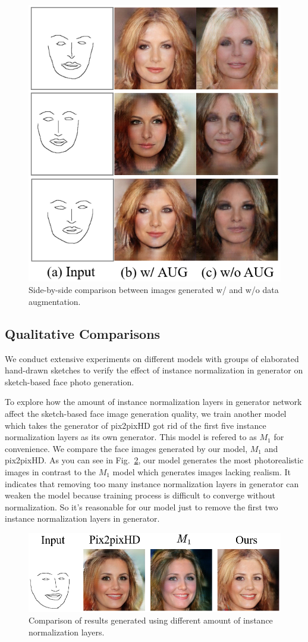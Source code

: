 \documentclass{article}
\begin{document}
\begin{figure}[htb]
	\centering
	\includegraphics[width=0.35 \textwidth]{data_augmentation.png}
	\caption{Side-by-side comparison between images generated w/ and w/o data augmentation. }
	\label{fig:data_augmentation}
\end{figure}


\subsection{Qualitative Comparisons}\label{sec:results}
We conduct extensive experiments on different models with groups of elaborated hand-drawn sketches to verify the effect of instance normalization in generator on sketch-based face photo generation.


To explore how the amount of instance normalization layers in generator network affect the sketch-based face image generation quality, we train another model which takes the generator of pix2pixHD got rid of the first five instance normalization layers as its own generator. 
This model is refered to as $M_1$ for convenience.
We compare the face images generated by our model, $M_1$ and pix2pixHD. 
As you can see in Fig.~\ref{fig:ablation}, our model generates the most photorealistic images in contrast to the $M_1$ model which generates images lacking realism. 
It indicates that removing too many instance normalization layers in generator can weaken the model because training process is difficult to converge without normalization.
So it's reasonable for our model just to remove the first two instance normalization layers in generator. 
\begin{figure}[htb]
	\centering
	\includegraphics[width=\columnwidth ]{ablation.png}
	\caption{Comparison of results generated using different amount of instance normalization layers. }
	\label{fig:ablation}
\end{figure}  
\end{document}
